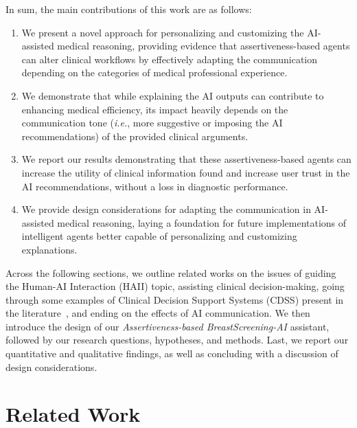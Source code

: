 \noindent
In sum, the main contributions of this work are as follows:

\vspace{0.5mm}

\begin{enumerate}
\item We present a novel approach for personalizing and customizing the AI-assisted medical reasoning, providing evidence that assertiveness-based agents can alter clinical workflows by effectively adapting the communication depending on the categories of medical professional experience.
\item We demonstrate that while explaining the AI outputs can contribute to enhancing medical efficiency, its impact heavily depends on the communication tone ({\it i.e.}, more suggestive or imposing the AI recommendations) of the provided clinical arguments.
\item We report our results demonstrating that these assertiveness-based agents can increase the utility of clinical information found and increase user trust in the AI recommendations, without a loss in diagnostic performance.
\item We provide design considerations for adapting the communication in AI-assisted medical reasoning, laying a foundation for future implementations of intelligent agents better capable of personalizing and customizing explanations.
\end{enumerate}

\vspace{0.5mm}

Across the following sections, we outline related works on the issues of guiding the Human-AI Interaction (HAII) topic, assisting clinical decision-making, going through some examples of Clinical Decision Support Systems (CDSS) present in the literature~\cite{NAISEH2023102941, 10.1145/3531146.3533193}, and ending on the effects of AI communication.
We then introduce the design of our {\it Assertiveness-based BreastScreening-AI} assistant, followed by our research questions, hypotheses, and methods.
Last, we report our quantitative and qualitative findings, as well as concluding with a discussion of design considerations.

\section{Related Work}
\label{sec:chap006002}

